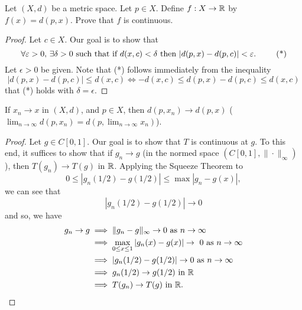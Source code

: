 \documentclass[a4paper]{article}
\begin{document}
\begin{eg}
    Let \( (X,d) \) be a metric space. Let \( p \in X  \). Define \( f: X \to \R  \) by \( f(x) = d(p,x) \). Prove that \( f  \) is continuous. 
\end{eg}
\begin{proof}
Let \( c \in X  \). Our goal is to show that 
\[ \text{\( \forall \epsilon > 0   \), \( \exists \delta > 0  \) such that if \( d(x,c) < \delta \) then \( | d(p,x) - d(p,c) | < \epsilon \). } \tag{*} \] 
Let \( \epsilon > 0  \) be given. Note that (*) follows immediately from the inequality 
\[  | d(p,x) - d(p,c) | \leq d(x,c) \iff -d(x,c) \leq d(p,x) - d(p,c) \leq d(x,c) \]
that (*) holds with \( \delta = \epsilon \).
\end{proof}
\begin{corollary}
    If \( {x}_{n} \to x  \) in \( (X,d) \), and \( p \in X  \), then \( d(p,{x}_{n}) \to d(p,x) \) (\( \lim_{ n \to \infty  } d(p,{x}_{n}) = d(p,\lim_{ n \to \infty  } {x}_{n}) \)). 
\end{corollary}

\begin{proof}
    Let \( g \in C[0,1] \). Our goal is to show that \( T  \) is continuous at \( g  \). To this end, it suffices to show that if \( {g}_{n} \to g  \) (in the normed space \( (C[0,1], \|\cdot\|_{\infty})  \)), then \( T({g}_{n}) \to T(g) \) in \( \R  \). Applying the Squeeze Theorem to 
    \[  0 \leq | {g}_{n}(1/2) - g(1/2) | \leq \max | {g}_{n} - g(x) |,  \]
    we can see that 
    \[  | {g}_{n}(1/2) - g(1/2) | \to 0 \]
    and so, we have
    \begin{align*}
        {g}_{n} \to g &\implies \|{g}_{n} - g\|_{\infty} \to 0 \ \text{as \( n \to \infty  \)} \\
                      &\implies \max_{0 \leq x \leq 1} | {g}_{n}(x) - g(x) | \to \  0 \  \text{as} \ n \to \infty  \\
                      &\implies | {g}_{n} (1/2) - g(1/2) |  \to 0 \ \text{as} \ n \to \infty  \\
                      &\implies {g}_{n}(1/2) \to g(1/2) \ \text{in \( \R \)} \\
                      &\implies T({g}_{n}) \to T(g) \ \text{in \( \R \)}.
    \end{align*}
\end{proof}
\end{document}
